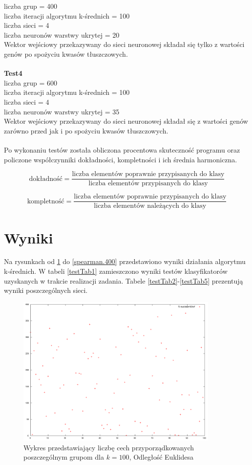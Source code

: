 \documentclass{classrep}
\begin{document}
liczba grup = 400\\
liczba iteracji algorytmu k-średnich = 100\\
liczba sieci = 4\\
liczba neuronów warstwy ukrytej = 20\\
Wektor wejściowy przekazywany do sieci neuronowej składał się tylko z wartości genów po spożyciu kwasów tłuszczowych.\\\\
\textbf{Test4}\\
liczba grup = 600\\
liczba iteracji algorytmu k-średnich = 100\\
liczba sieci = 4\\
liczba neuronów warstwy ukrytej = 35\\
Wektor wejściowy przekazywany do sieci neuronowej składał się z wartości genów zarówno przed jak i po spożyciu kwasów tłuszczowych.\\\\

Po wykonaniu testów została obliczona procentowa skuteczność programu oraz policzone współczynniki dokładności, kompletności i ich średnia harmoniczna.

\begin{equation}
\mbox{dokładność} = \frac{\mbox{liczba elementów poprawnie przypisanych do klasy}}{\mbox{liczba elementów przypisanych do klasy}}
\end{equation}

\begin{equation}
\mbox{kompletność} = \frac{\mbox{liczba elementów poprawnie przypisanych do klasy}}{\mbox{liczba elementów należących do klasy}}
\end{equation}

\section{Wyniki}
Na rysunkach od \ref{euclidean.100} do \ref{spearman.400} przedstawiono wyniki działania algorytmu k-średnich. W tabeli \ref{testTab1} zamieszczono wyniki testów klasyfikatorów uzyskanych w trakcie realizacji zadania. Tabele \ref{testTab2}-\ref{testTab5} prezentują wyniki poszczególnych sieci.
\begin{figure}
  \centering
  \includegraphics[width=10cm]{img/euclidean100.png}
  \caption{Wykres przedstawiający liczbę cech przyporządkowanych poszczególnym
grupom dla $k=100$, Odległość Euklidesa}
  \label{euclidean.100}
\end{figure}
\end{document}
